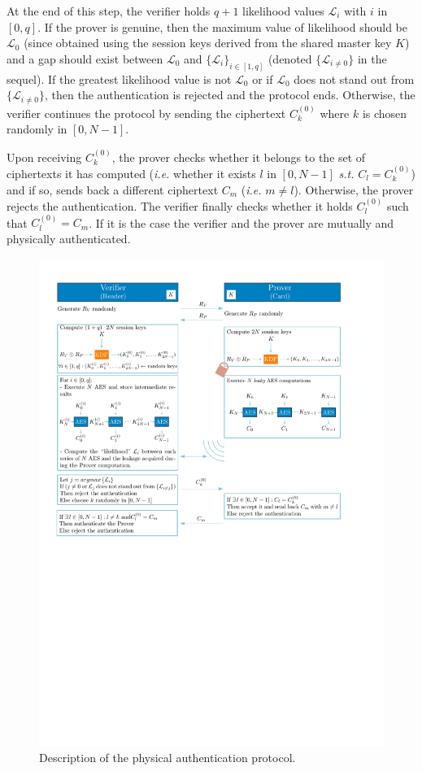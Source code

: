 At the end of this step, the verifier holds $q+1$ likelihood values $\mathcal{L}_i$ with $i$ in $[0, q]$.
If the prover is genuine, then the maximum value of likelihood should be $\mathcal{L}_0$ (since obtained using the  session keys derived from the shared master key $K$) and a gap should exist between $\mathcal{L}_0$ and $\{\mathcal{L}_{i}\}_{i\in [1,q]}$ (denoted $\{\mathcal{L}_{i\not=0}\}$ in the sequel).
If the greatest likelihood value is not $\mathcal{L}_0$ or if $\mathcal{L}_0$ does not stand out from $\{\mathcal{L}_{i\not=0}\}$, then the authentication is rejected and the protocol ends.
Otherwise, the verifier continues the protocol by sending the ciphertext $C_k^{(0)}$ where $k$ is chosen randomly in $[0, N-1]$.

Upon receiving $C_k^{(0)}$, the prover checks whether it belongs to the set of ciphertexts it has computed (\emph{i.e.} whether it exists $l$ in $[0, N-1]$ \emph{s.t.} $C_l = C_k^{(0)}$) and if so, sends back a different ciphertext $C_m$ (\emph{i.e.} $ m \neq l$). Otherwise, the prover rejects the authentication. The verifier finally checks whether it holds $C_l^{(0)}$ such that $C_l^{(0)} = C_m$. If it is the case the verifier and the prover are mutually and physically authenticated.

\begin{figure}[ht!]
   \includegraphics[width=1.0\linewidth]{../pics/protocol_2N-1.pdf}
   \caption{Description of the physical authentication protocol.} \label{fig:protocol}
\end{figure}

